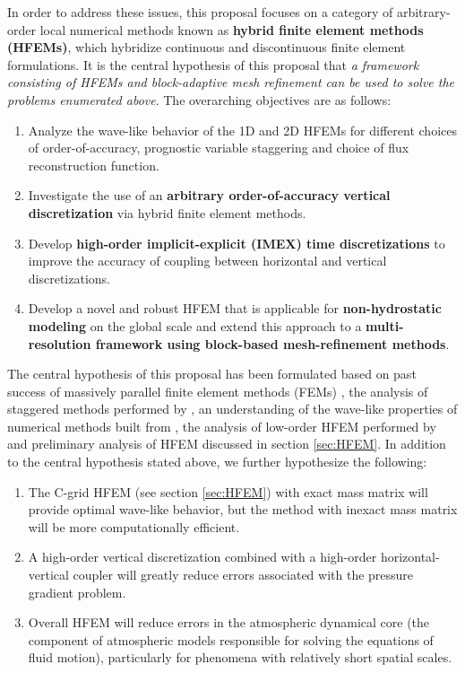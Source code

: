 \documentclass[11pt]{article}
\begin{document}
\vspace{-0.4cm}
In order to address these issues, this proposal focuses on a category of arbitrary-order local numerical methods known as \textbf{hybrid finite element methods (HFEMs)}, which hybridize continuous and discontinuous finite element formulations.  It is the central hypothesis of this proposal that \textit{a framework consisting of HFEMs and block-adaptive mesh refinement can be used to solve the problems enumerated above}.  The overarching objectives are as follows:
\vspace{-0.4cm}
\begin{enumerate}
\item Analyze the wave-like behavior of the 1D and 2D HFEMs for different choices of order-of-accuracy, prognostic variable staggering and choice of flux reconstruction function.

\item Investigate the use of an \textbf{arbitrary order-of-accuracy vertical discretization} via hybrid finite element methods.

\item Develop \textbf{high-order implicit-explicit (IMEX) time discretizations} to improve the accuracy of coupling between horizontal and vertical discretizations.

\item Develop a novel and robust HFEM that is applicable for \textbf{non-hydrostatic modeling} on the global scale and extend this approach to a \textbf{multi-resolution framework using block-based mesh-refinement methods}.
\end{enumerate}
\vspace{-0.4cm}
The central hypothesis of this proposal has been formulated based on past success of massively parallel finite element methods (FEMs) \citep{JDJEKJEONGetal2011IJHPCA}, the analysis of staggered methods performed by \cite{JTTJW2005JCP}, an understanding of the wave-like properties of numerical methods built from \cite{PAUCJ2011JCP}, the analysis of low-order HFEM performed by \cite{CJCJS2012JCP} and preliminary analysis of HFEM discussed in section \ref{sec:HFEM}.  In addition to the central hypothesis stated above, we further hypothesize the following: 
\vspace{-0.4cm}
\begin{enumerate}
\item The C-grid HFEM (see section \ref{sec:HFEM}) with exact mass matrix will provide optimal wave-like behavior, but the method with inexact mass matrix will be more computationally efficient.

\item A high-order vertical discretization combined with a high-order horizontal-vertical coupler will greatly reduce errors associated with the pressure gradient problem.

\item Overall HFEM will reduce errors in the atmospheric dynamical core (the component of atmospheric models responsible for solving the equations of fluid motion), particularly for phenomena with relatively short spatial scales.
\end{enumerate}
\end{document}
